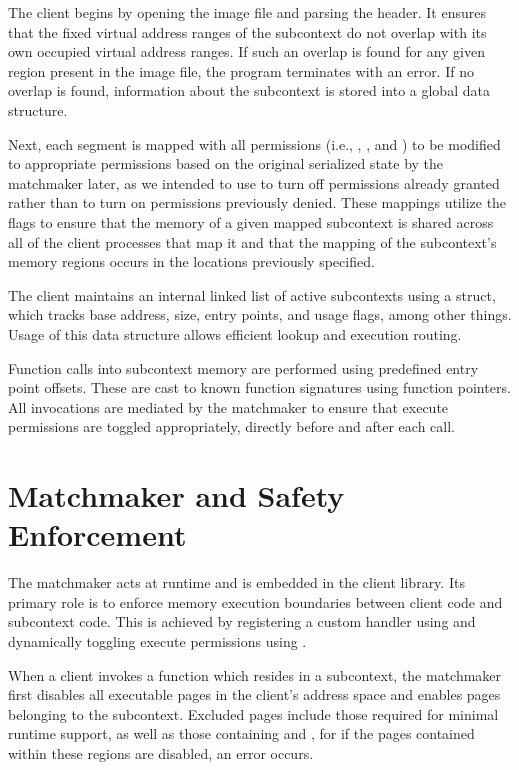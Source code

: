 The client begins by opening the image file and parsing the header. It ensures that the fixed virtual address ranges of the subcontext do not overlap with its own occupied virtual address ranges. If such an overlap is found for any given region present in the image file, the program terminates with an error. If no overlap is found, information about the subcontext is stored into a global data structure.

Next, each segment is mapped with all permissions (i.e., , , and ) to be modified to appropriate permissions based on the original serialized state by the matchmaker later, as we intended to use  to turn off permissions already granted rather than to turn on permissions previously denied. These mappings utilize the  flags to ensure that the memory of a given mapped subcontext is shared across all of the client processes that map it and that the mapping of the subcontext's memory regions occurs in the locations previously specified.

The client maintains an internal linked list of active subcontexts using a  struct, which tracks base address, size, entry points, and usage flags, among other things. Usage of this data structure allows efficient lookup and execution routing.

Function calls into subcontext memory are performed using predefined entry point offsets. These are cast to known function signatures using function pointers. All invocations are mediated by the matchmaker to ensure that execute permissions are toggled appropriately, directly before and after each call.

\section*{Matchmaker and Safety Enforcement}
The matchmaker acts at runtime and is embedded in the client library. Its primary role is to enforce memory execution boundaries between client code and subcontext code. This is achieved by registering a custom  handler using and dynamically toggling execute permissions using .

When a client invokes a function which resides in a subcontext, the matchmaker first disables all executable pages in the client’s address space and enables pages belonging to the subcontext. Excluded pages include those required for minimal runtime support, as well as those containing \cinline{[vvar]} and \cinline{[vdso]}, for if the pages contained within these regions are disabled, an  error occurs.


